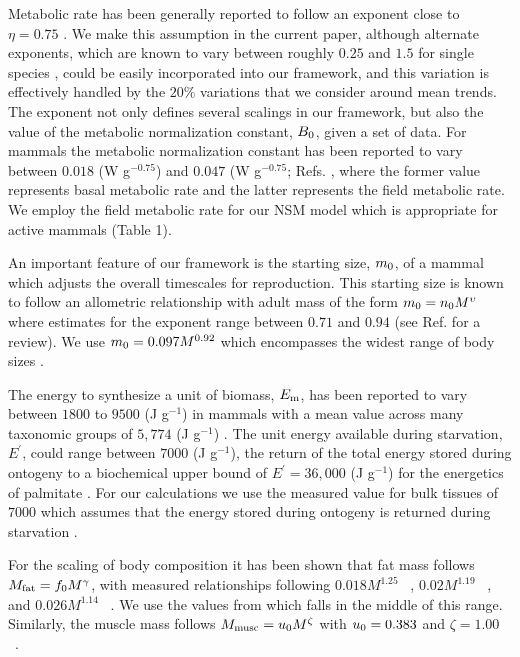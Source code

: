 \documentclass[twocolumn,preprintnumbers,amsmath,amssymb,superscriptaddress]{revtex4}
\begin{document}
{Metabolic rate has been generally reported to follow an exponent close to $\eta=0.75$  \citep{West:2001bv,moses2008rmo,hou}. We make this assumption in the current paper, although alternate exponents, which are known to vary between roughly $0.25$ and $1.5$ for single species \citep{moses2008rmo}, could be easily incorporated into our framework, and this variation is effectively handled by the $20\%$ variations that we consider around mean trends. The exponent not only defines several scalings in our framework, but also the value of the metabolic normalization constant, $B_{\rm 0}$, given a set of data.  For mammals the metabolic normalization constant has been reported to vary between $0.018$ (W g$^{-0.75}$) and $0.047$ (W g$^{-0.75}$; Refs. \citep{hou,West:2001bv}, where the former value represents basal metabolic rate and the latter represents the field metabolic rate. We employ the field metabolic rate for our NSM model which is appropriate for active mammals (Table 1).

An important feature of our framework is the starting size, $m_{\rm 0}$, of a mammal which adjusts the overall timescales for reproduction. This starting size is known to follow an allometric relationship with adult mass of the form $m_{\rm 0}=n_{\rm 0}M^{\upsilon}$ where estimates for the exponent range between $0.71$ and $0.94$ (see Ref. \citep{peters1986ecological} for a review). We use $m_{\rm 0}=0.097M^{0.92}$ \citep{blueweiss1978relationships} which encompasses the widest range of body sizes \citep{peters1986ecological}.

The energy to synthesize a unit of biomass, $E_{\rm m}$, has been reported to vary between $1800$ to $9500$ (J g$^{-1}$) \citep{West:2001bv,moses2008rmo,hou} in mammals with a mean value across many taxonomic groups of $5,774$ (J g$^{-1}$) \citep{moses2008rmo}. The unit energy available during starvation, $E^{\prime}$, could range between $7000$ (J g$^{-1}$), the return of the total energy stored during ontogeny \citep{hou} to a biochemical upper bound of $E^{\prime}=36,000$ (J g$^{-1}$) for the energetics of palmitate \citep{stryer,hou}. For our calculations we use the measured value for bulk tissues of $7000$ which assumes that the energy stored during ontogeny is returned during starvation \citep{hou}.

For the scaling of body composition it has been shown that fat mass follows $M_{\rm \rm fat}=f_{\rm 0}M^{\gamma}$, with measured  relationships following  $0.018M^{1.25}$ ~\citep{Dunbrack:1993ec}, $0.02M^{1.19}$ ~\citep{Lindstedt:1985hm}, and $0.026M^{1.14}$ ~\citep{Lindstedt:2002td}. We use the values from \citep{Lindstedt:1985hm} which falls in the middle of this range. Similarly, the muscle mass follows $M_{\rm \rm musc}=u_{\rm 0}M^{\zeta}$ with $u_{\rm 0}=0.383$ and $\zeta=1.00$ ~\citep{Lindstedt:2002td}.


}
\end{document}
